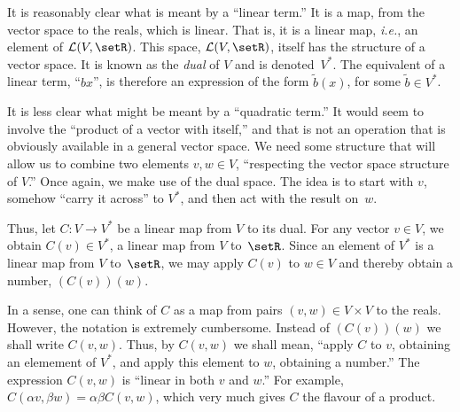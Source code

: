 \documentclass[10pt, a4paper]{article}
\newcommand{\ie}{\emph{i.e.}}
\begin{document}
It is reasonably clear what is meant by a “linear term.” It is a map,
from the vector space to the reals, which is linear. That is, it is a
linear map, \ie, an element of $\mathcal{L}(V, \setR)$. This space, $\mathcal{L}(V,
\setR)$, itself has the structure of a vector space. It is known as
the \emph{dual} of $V$ and is denoted~$V^*$. The equivalent of a
linear term, “$bx$”, is therefore an expression of the form
$\tilde{b}(x)$, for some $\tilde{b}\in V^*$.

It is less clear what might be meant by a “quadratic term.” It would
seem to involve the “product of a vector with itself,” and that is not
an operation that is obviously available in a general vector space. We
need some structure that will allow us to combine two elements $v, w\in
V$, “respecting the vector space structure of $V$.” Once again, we
make use of the dual space. The idea is to start with $v$, somehow
“carry it across” to $V^*$, and then act with the result on~$w$.

Thus, let $C\colon V\to V^*$ be a linear map from $V$ to its dual. For
any vector $v\in V$, we obtain $C(v)\in V^*$, a linear map from $V$
to~$\setR$. Since an element of $V^*$ is a linear map from $V$
to~$\setR$, we may apply $C(v)$ to $w\in V$ and thereby obtain a number,
$(C(v))(w)$.

In a sense, one can think of $C$ as a map from pairs $(v,w)\in V\times V$ to
the reals. However, the notation is extremely cumbersome. Instead of
$(C(v))(w)$ we shall write $C(v,w)$. Thus, by $C(v, w)$ we shall mean,
“apply $C$ to $v$, obtaining an elemement of $V^*$, and apply this
element to $w$, obtaining a number.” The expression $C(v, w)$ is
“linear in both $v$ and $w$.” For example, $C(\alpha v, \beta w) = \alpha\beta C(v,w)$,
which very much gives $C$ the flavour of a product.
\end{document}
